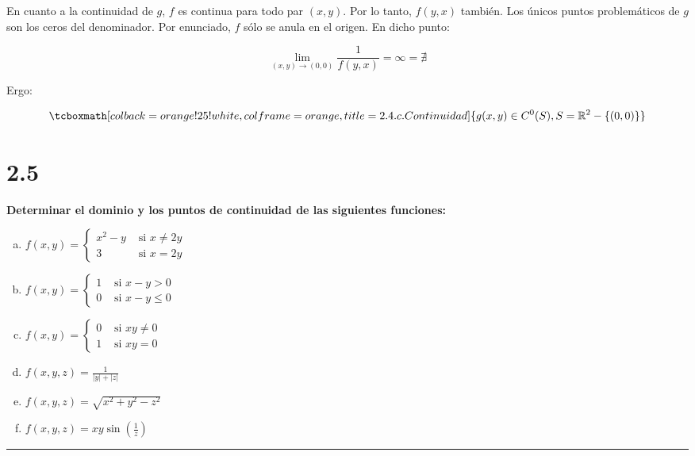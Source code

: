\documentclass{article}
\renewcommand{\Bbb}{\mathbb}
\begin{document}
En cuanto a la continuidad de $g$, $f$ es continua para todo par $(x,y)$. Por lo tanto, $f(y, x)$ también. Los únicos puntos problemáticos de $g$ son los ceros del denominador. Por enunciado, $f$ sólo se anula en el origen. En dicho punto:

\begin{equation}
\lim_{(x,y) \rightarrow (0,0)} \frac{1}{f(y,x)} = \infty = \nexists
\end{equation}

Ergo:

\begin{equation}
\tcboxmath[colback=orange!25!white,colframe=orange,title=2.4.c. Continuidad ]
{ g(x,y) \in C^0(S), S = \Bbb R^2 - \{ (0,0) \} }
\end{equation}

\section*{2.5}
\label{sec:2.5}

\textbf{Determinar el dominio y los puntos de continuidad de las siguientes funciones:}

\begin{enumerate}[(a)]
\bfseries
\item $ f(x,y) = \left\{ \begin{array}{ll}
x^2 - y &\text{ si } x \neq 2y \\
3 &\text{ si } x = 2y
\end{array} \right. $

\item $f(x,y) = \left\{ \begin{array}{ll}
1 &\text{ si } x - y > 0 \\
0 &\text{ si } x - y \leq 0
\end{array} \right.$

\item $f(x,y) = \left\{ \begin{array}{ll}
0 &\text{ si } xy \neq 0 \\
1 &\text{ si } xy = 0
\end{array} \right.$

\item $f(x, y, z) = \frac{1}{|y| + |z|}$

\item $f(x, y, z) = \sqrt{x^2 + y^2 - z^2}$

\item $f(x, y, z) = x y \sin\left( \frac{1}{z} \right)$

\end{enumerate}
\hrule
\end{document}
